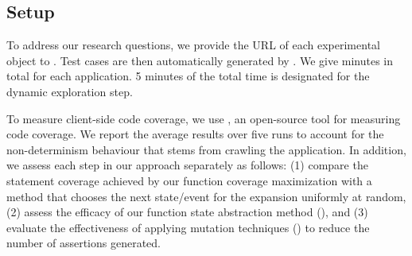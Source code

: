 \subsection{Setup} \label{Sec:setup}
To address our research questions, we provide the URL of each  experimental object to \jseft.
Test cases are then automatically generated by \jseft.
We give  minutes in total for each application. 
5 minutes of the total time is designated for the dynamic exploration step.

%
 \label{test-gen-setup}
To measure client-side code coverage, we use \jscover \cite{jscover}, an open-source tool for measuring \javascript code coverage. We report the average results over five runs to account for the non-determinism behaviour that stems from crawling the application.
In addition,  we assess each step in our approach separately as follows: 
(1) compare the statement coverage achieved by our function coverage maximization with a method that chooses the next state/event for the expansion uniformly at random, 
(2) assess the efficacy of our function state abstraction method (), and 
(3) evaluate the effectiveness of applying mutation techniques () to reduce the number of assertions generated.

